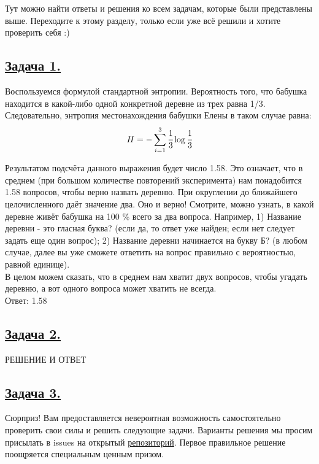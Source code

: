 Тут можно найти ответы и решения ко всем задачам, которые были представлены выше. Переходите к этому разделу, только если уже всё решили и хотите проверить себя :)

\subsection*{\hyperref[sec:problem1]{Задача 1.}}\label{sec:sol_problem1}

Воспользуемся формулой стандартной энтропии. Вероятность того, что бабушка находится в какой-либо одной конкретной деревне из трех равна 1/3. Следовательно, энтропия местонахождения бабушки Елены в таком случае равна: 
\[H=-\sum\limits_{i=1}^3 \cfrac{1}{3}\log \cfrac{1}{3} \]

Результатом подсчёта данного выражения будет число 1.58. Это означает, что в среднем (при большом количестве повторений эксперимента) нам понадобится 1.58 вопросов, чтобы верно назвать деревню. При округлении до ближайшего целочисленного даёт значение два. Оно и верно! Смотрите, можно узнать, в какой деревне живёт бабушка на 100 \%  всего за два вопроса. Например, 1) Название деревни - это гласная буква? (если да, то ответ уже найден; если нет следует задать еще один вопрос); 2) Название деревни начинается на букву Б? (в любом случае, далее вы уже сможете ответить на вопрос правильно с вероятностью, равной единице).  \\
В целом можем сказать, что в среднем нам хватит двух вопросов, чтобы угадать деревню, а вот одного вопроса может хватить не всегда. \\

Ответ: 1.58


\subsection*{\hyperref[sec:problem2]{Задача 2.}}\label{sec:sol_problem2}

РЕШЕНИЕ И ОТВЕТ

\subsection*{\hyperref[sec:problem3]{Задача 3.}}\label{sec:sol_problem3}

Сюрприз! Вам предоставляется невероятная возможность самостоятельно проверить свои силы и решить следующие задачи. Варианты решения мы просим присылать в issues на открытый \href{https://github.com/oomaystrenko/entropy}{репозиторий}. Первое правильное решение поощряется специальным ценным призом. 

